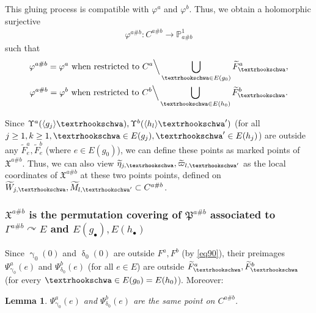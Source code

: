 \documentclass[12pt,a4paper,notitlepage]{article}
\theoremstyle{definition}
\theoremstyle{plain}
\newtheorem{lm}[df]{Lemma}
\newcommand{\fk}{\mathfrak}
\newcommand{\wtd}{\widetilde}
\newcommand{\bk}[1]{\langle {#1}\rangle}
\newcommand{\blt}{\bullet}
\newcommand{\Pbb}{\mathbb P}
\newcommand{\tipae}{\text{\textrhookschwa}}
\numberwithin{equation}{subsection}
\begin{document}
This gluing process is compatible with $\varphi^a$ and $\varphi^b$. Thus, we obtain a holomorphic surjective
\begin{align*}
\varphi^{a\#b}:C^{a\#b}\rightarrow \Pbb^1_{a\#b}	
\end{align*}
such that
\begin{gather*}
\varphi^{a\#b}=\varphi^a\text{ when restricted to }C^a\Big\backslash\bigcup_{\tipae\in E(g_0)}\wtd F_\tipae^a,	\\
\varphi^{a\#b}=\varphi^b\text{ when restricted to }C^b\Big\backslash\bigcup_{\tipae\in E(h_0)}\wtd F_\tipae^b.
\end{gather*}

Since $\Upsilon^a(\bk{g_j}\tipae),\Upsilon^b(\bk{h_l}\tipae')$ (for all $j\geq 1,k\geq 1,\tipae\in E(g_j),\tipae'\in E(h_j)$) are outside any $\wtd F^a_e,\wtd F^b_e$ (where $e\in E(g_0)$), we can define these points as marked points of $\fk X^{a\#b}$. Thus, we can also view $\wtd\eta_{j,\tipae},\wtd\varpi_{l,\tipae'}$ as the local coordinates of $\fk X^{a\#b}$ at these two points points, defined on $\wtd W_{j,\tipae},\wtd M_{l,\tipae'}\subset C^{a\#b}$.



\subsubsection[$\fk X^{a\#b}$ is the permutation covering of $\fk P^{a\#b}$]{$\fk X^{a\#b}$ is the permutation covering of $\fk P^{a\#b}$ associated to $\Gamma^{a\#b}\curvearrowright E$ and $E(g_\blt),E(h_\blt)$}


Since $\upgamma_0(0)$ and $\updelta_0(0)$ are outside $F^a,F^b$ (by \eqref{eq90}), their preimages $\Psi_{\upgamma_0}^a(e)$ and $\Psi_{\updelta_0}^b(e)$ (for all $e\in E$) are outside $\wtd F^a_\tipae,\wtd F^b_\tipae$ (for every $\tipae\in E(g_0)=E(h_0)$). Moreover:

\begin{lm}
$\Psi_{\upgamma_0}^a(e)$ and $\Psi_{\updelta_0}^b(e)$ are the same point on $C^{a\#b}$.
\end{lm}
\end{document}
